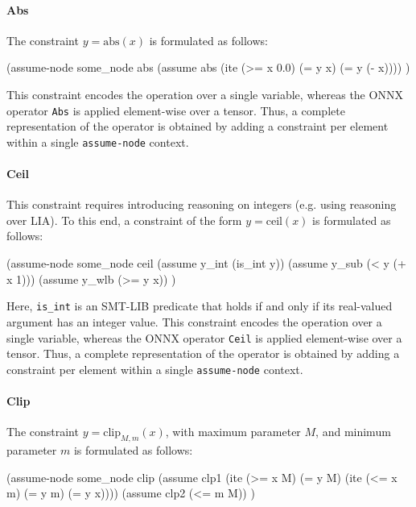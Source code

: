 \paragraph{Abs}
The constraint $y = \mathrm{abs}(x)$ is formulated as
follows: 

\begin{code}[style=lbnf]
(assume-node some_node abs
    (assume abs (ite (>= x 0.0) 
                     (= y x) 
                     (= y (- x)))) 
)
\end{code}

\noindent This constraint encodes the operation over a single variable, whereas the ONNX operator \texttt{Abs} is applied element-wise over a tensor. 
Thus, a complete representation of the operator is obtained by adding a constraint per element within a single \texttt{assume-node} context.

\paragraph{Ceil}
This constraint requires introducing reasoning on integers (e.g. using reasoning over LIA). To this end, a constraint of the form 
$y = \mathrm{ceil}(x)$ is formulated as
follows: 

\begin{code}[style=lbnf]
(assume-node some_node ceil
    (assume y_int (is_int y))
    (assume y_sub (< y (+ x 1)))
    (assume y_wlb (>= y x))
)
\end{code} 

Here, \texttt{is\_int} is an SMT-LIB predicate that holds if and only if its real-valued argument has an integer value.
This constraint encodes the operation over a single variable, whereas the ONNX operator \texttt{Ceil} is applied element-wise over a tensor. 
Thus, a complete representation of the operator is obtained by adding a constraint per element within a single \texttt{assume-node} context.

\paragraph{Clip}
The constraint $y = \mathrm{clip}_{M,m}(x)$, with maximum parameter $M$, and minimum parameter $m$ is formulated as
follows: 

\begin{code}[style=lbnf]
(assume-node some_node clip
    (assume clp1 (ite (>= x M) 
                      (= y M) 
                      (ite (<= x m) 
                           (= y m) 
                           (= y x))))
    (assume clp2 (<= m M))                      
)                        
\end{code}

